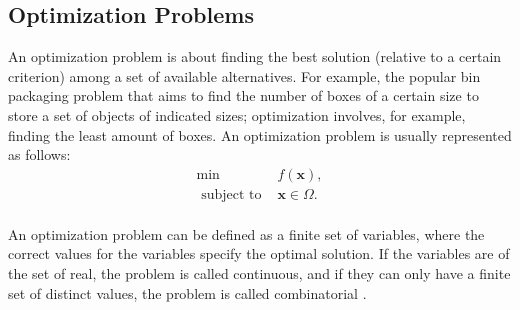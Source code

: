 \documentclass[conference,harvard,brazil,english]{sbatex}
\begin{document}




\subsection{Optimization Problems}

An optimization problem is about finding the best solution (relative to a certain criterion) among a set of available alternatives. For example, the popular bin packaging problem that aims to find the number of boxes of a certain size to store a set of objects of indicated sizes; optimization involves, for example, finding the least amount of boxes. An optimization problem is usually represented as follows:
\begin{equation}
	\label{eq:optproblema}
	\begin{array}{cc}
		\min & f(\textbf{x}),  \\
		\textrm{ subject to } & \textbf{x}\in\Omega.\\
	\end{array}
\end{equation}	
	
An optimization problem can be defined as a finite set of variables, where the correct values for the variables specify the optimal solution. If the variables are of the set of real, the problem is called continuous, and if they can only have a finite set of distinct values, the problem is called combinatorial \protect\cite{francq2011optimization}.
\end{document}

